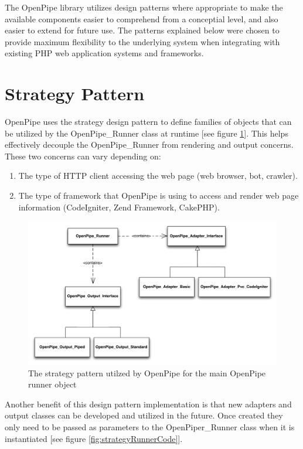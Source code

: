 \documentclass[12pt]{report}
\begin{document}
The OpenPipe library utilizes design patterns where appropriate to make the available components easier to comprehend from a conceptial level, and also easier to extend for future use. The patterns explained below were chosen to provide maximum flexibility to the underlying system when integrating with existing PHP web application systems and frameworks.

\section{Strategy Pattern}

OpenPipe uses the strategy design pattern to define families of objects that can be utilized by the OpenPipe\_Runner class at runtime [see figure \ref{fig:strategyRunner}]. This helps effectively decouple the OpenPipe\_Runner from rendering and output concerns. These two concerns can vary depending on:

\begin{enumerate}
	\item The type of HTTP client accessing the web page (web browser, bot, crawler).
	\item The type of framework that OpenPipe is using to access and render web page information (CodeIgniter, Zend Framework, CakePHP).
\end{enumerate}

\begin{figure}[H]
\label{fig:strategyRunner}
\centering
\includegraphics[width=\textwidth,keepaspectratio]{figures/images/strategy_runner.pdf}
\caption{The strategy pattern utilzed by OpenPipe for the main OpenPipe runner object}
\end{figure}

Another benefit of this design pattern implementation is that new adapters and output classes can be developed and utilized in the future. Once created they only need to be passed as parameters to the OpenPiper\_Runner class when it is instantiated [see figure \ref{fig:strategyRunnerCode}].
\end{document}
